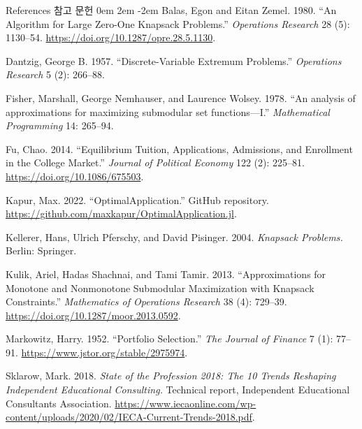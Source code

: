 \documentclass[11pt,mathserif,notheorems]{beamer}
\theoremstyle{definition}
\theoremstyle{definition}
\begin{document}
\begin{frame}[allowframebreaks]{\ifen References \else 참고 문헌 \fi}
\parskip 0em
\leftskip 2em
\parindent -2em
Balas, Egon and Eitan Zemel. 1980. ``An Algorithm for Large Zero-One Knapsack Problems.'' \emph{Operations Research} 28 (5): 1130--54. \url{https://doi.org/10.1287/opre.28.5.1130}. 

Dantzig, George B. 1957. ``Discrete-Variable Extremum Problems.'' \emph{Operations Research} 5 (2): 266--88.

Fisher, Marshall, George Nemhauser, and Laurence Wolsey. 1978. ``An analysis of approximations for maximizing submodular set functions—I.'' \emph{Mathematical Programming} 14: 265--94. 

Fu, Chao. 2014. ``Equilibrium Tuition, Applications, Admissions, and Enrollment in the College Market.'' \emph{Journal of Political Economy} 122 (2): 225--81. \url{https://doi.org/10.1086/675503}. 

Kapur, Max. 2022. ``OptimalApplication.'' GitHub repository. \url{https://github.com/maxkapur/OptimalApplication.jl}.


\framebreak

Kellerer, Hans, Ulrich Pferschy, and David Pisinger. 2004. \emph{Knapsack Problems.} Berlin: Springer.

Kulik, Ariel, Hadas Shachnai, and Tami Tamir. 2013. ``Approximations for Monotone and Nonmonotone Submodular Maximization with Knapsack Constraints.'' \emph{Mathematics of Operations Research} 38 (4): 729--39. \url{https://doi.org/10.1287/moor.2013.0592}.

Markowitz, Harry. 1952. ``Portfolio Selection.'' \emph{The Journal of Finance} 7 (1): 77--91. \url{https://www.jstor.org/stable/2975974}.


Sklarow, Mark. 2018. \emph{State of the Profession 2018: The 10 Trends Reshaping Independent Educational Consulting.} Technical report, Independent Educational Consultants Association. \url{https://www.iecaonline.com/wp-content/uploads/2020/02/IECA-Current-Trends-2018.pdf}.

\end{frame}
\end{document}
